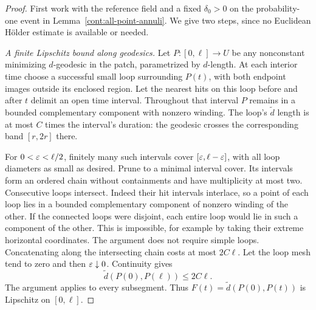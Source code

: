 \begin{proof}
First work with the reference field and a fixed $\delta_0>0$ on the
probability-one event in Lemma~\ref{cont:all-point-annuli}.  We give two
steps, since no Euclidean H\"older estimate is available or needed.

\emph{A finite Lipschitz bound along geodesics.}
Let $P:[0,\ell]\to U$ be any nonconstant minimizing $d$-geodesic in the patch,
parametrized by $d$-length.  At each interior time choose a successful small
loop surrounding $P(t)$, with both endpoint images outside its enclosed
region.  Let the nearest hits on this loop before and after $t$ delimit
an open time interval.  Throughout that interval $P$ remains in a bounded
complementary component with nonzero winding.  The loop's $\widetilde d$
length is at most $C$ times the interval's duration: the geodesic crosses
the corresponding band $[r,2r]$ there.

For $0<\varepsilon<\ell/2$, finitely many such intervals cover
$[\varepsilon,\ell-\varepsilon]$, with all loop diameters as small as desired.  Prune to
a minimal interval cover.  Its intervals form an ordered chain without
containments and have multiplicity at most two.  Consecutive loops
intersect.  Indeed their hit intervals interlace, so a point of each loop
lies in a bounded complementary component of nonzero winding of the other.
If the connected loops were disjoint, each entire loop would lie in such
a component of the other.  This is impossible, for example by taking their
extreme horizontal coordinates.  The argument does not require simple
loops.  Concatenating along the intersecting chain costs at most $2C\ell$.
Let the loop mesh tend to zero and then $\varepsilon\downarrow0$.  Continuity gives
\[
 \widetilde d(P(0),P(\ell))\leq2C\ell.
\]
The argument applies to every subsegment.  Thus
$F(t)=\widetilde d(P(0),P(t))$ is Lipschitz on $[0,\ell]$.


\end{proof}
